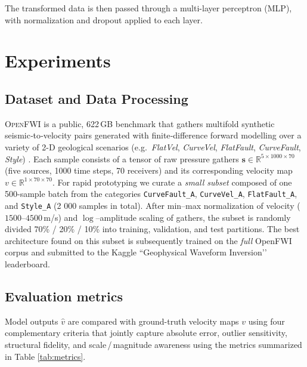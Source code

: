 \documentclass{article}
\newcommand{\instructions}[1]{{\color{blue} #1}}
\begin{document}
The transformed data is then passed through a multi-layer perceptron (MLP), with normalization and dropout applied to each layer.

\section{Experiments}

\subsection{Dataset and Data Processing}\label{subsec:data}
\textsc{OpenFWI} is a public, 622\,GB benchmark that gathers multi\-fold synthetic seismic‐to‐velocity pairs generated with finite‐difference forward modelling over a variety of 2-D geological scenarios (e.g.\ \emph{FlatVel}, \emph{CurveVel}, \emph{FlatFault}, \emph{CurveFault}, \emph{Style}) \cite{openfwi2021,openfwi2023}.  Each sample consists of a tensor of raw pressure gathers $\mathbf{s}\!\in\!\mathbb{R}^{5\times1000\times70}$ (five sources, 1000 time steps, 70 receivers) and its corresponding velocity map $v\!\in\!\mathbb{R}^{1\times70\times70}$.  
For rapid prototyping we curate a \emph{small subset} composed of one 500-sample batch from the categories \texttt{CurveFault\_A}, \texttt{CurveVel\_A}, \texttt{FlatFault\_A}, and \texttt{Style\_A} (2 000 samples in total).  
After min–max normalization of velocity ($1500$–$4500$\,m/s) and $\log$–amplitude scaling of gathers, the subset is randomly divided 70\% / 20\% / 10\% into training, validation, and test partitions.  
The best architecture found on this subset is subsequently trained on the \emph{full} OpenFWI corpus and submitted to the Kaggle “Geophysical Waveform Inversion’’ leaderboard.

\subsection{Evaluation metrics}\label{subsec:metrics}
Model outputs $\hat{v}$ are compared with ground-truth velocity maps $v$ using four complementary criteria that jointly capture absolute error, outlier sensitivity, structural fidelity, and scale\,/\,magnitude awareness using the metrics summarized in Table \ref{tab:metrics}.
\end{document}
